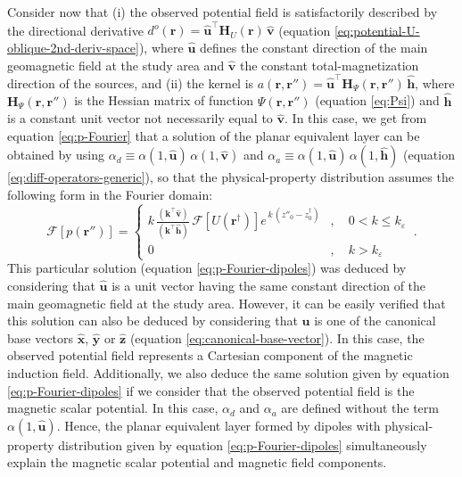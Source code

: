 Consider now that (i) the observed potential field 
is satisfactorily described by the directional derivative $d^{o}(\mathbf{r}) = \hat{\mathbf{u}}^{\top} \mathbf{H}_{U}(\mathbf{r}) \, \hat{\mathbf{v}}$ 
(equation \ref{eq:potential-U-oblique-2nd-deriv-space}), where $\hat{\mathbf{u}}$ defines the constant direction of the main geomagnetic
field at the study area and $\hat{\mathbf{v}}$ the constant total-magnetization direction of the sources, and (ii)
the kernel is $a(\mathbf{r}, \mathbf{r}'') = \hat{\mathbf{u}}^{\top} \mathbf{H}_{\Psi}(\mathbf{r}, \mathbf{r}'') \, \hat{\mathbf{h}}$,
where $\mathbf{H}_{\Psi}(\mathbf{r}, \mathbf{r}'')$ is the Hessian matrix \citep[e.g.,][ p. 158]{kaplan2002} of
function $\Psi(\mathbf{r}, \mathbf{r}'')$ (equation \ref{eq:Psi}) and $\hat{\mathbf{h}}$ is a constant unit vector not necessarily equal to 
$\hat{\mathbf{v}}$.
In this case, we get from equation \ref{eq:p-Fourier} that a solution of the planar equivalent layer 
can be obtained by using 
$\alpha_{d} \equiv \alpha(1, \hat{\mathbf{u}}) \, \alpha(1, \hat{\mathbf{v}})$ and 
$\alpha_{a} \equiv \alpha(1, \hat{\mathbf{u}}) \, \alpha(1, \hat{\mathbf{h}})$ 
(equation \ref{eq:diff-operators-generic}), so that the physical-property distribution assumes the following form 
in the Fourier domain:
\begin{equation}
	\mathcal{F} [ p(\mathbf{r}'') ] =
	\begin{cases}
		k \, \tfrac{\left(\mathbf{k}^{\top} \hat{\mathbf{v}} \right)}{\left(\mathbf{k}^{\top} \hat{\mathbf{h}} \right)} \,
		\mathcal{F} \left[ U(\mathbf{r}^{\dagger}) \right] 
		e^{\, k \, (z''_{0} - z^{\dagger}_{0})} & , 
		\quad 0 < k \le k_{\varepsilon} \\
		0 & , \quad k > k_{\varepsilon} 
	\end{cases} \: .
	\label{eq:p-Fourier-dipoles}
\end{equation}
This particular solution (equation \ref{eq:p-Fourier-dipoles}) was deduced by considering
that $\hat{\mathbf{u}}$ is a unit vector having the same constant direction of the main geomagnetic field at the study area.
However, it can be easily verified that this solution can also be deduced by considering that $\hat{\mathbf{u}}$ is one of the
canonical base vectors $\hat{\mathbf{x}}$, $\hat{\mathbf{y}}$ or $\hat{\mathbf{z}}$ (equation \ref{eq:canonical-base-vector}).
In this case, the observed potential field represents a Cartesian component of the magnetic induction field.
Additionally, we also deduce the same solution given by equation \ref{eq:p-Fourier-dipoles} if we consider that the 
observed potential field is the magnetic scalar potential. In this case, $\alpha_{d}$ and $\alpha_{a}$ are defined
without the term $\alpha(1, \hat{\mathbf{u}})$.
Hence, the planar equivalent layer formed by dipoles with physical-property distribution 
given by equation \ref{eq:p-Fourier-dipoles} simultaneously explain the magnetic scalar potential and
magnetic field components.

